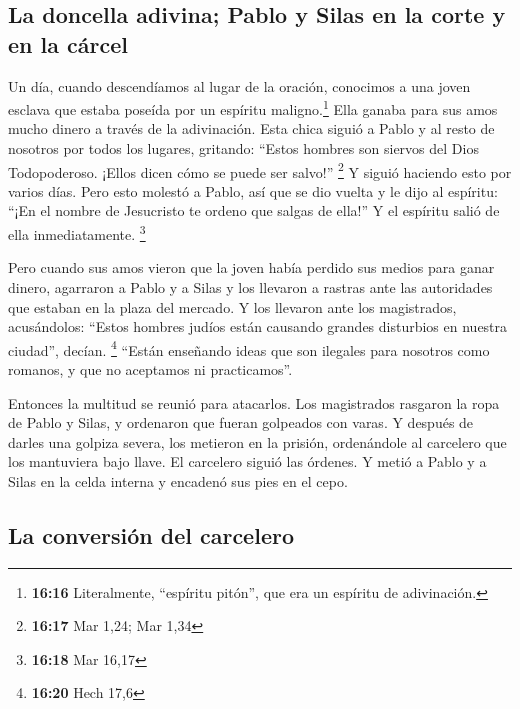 \hypertarget{la-doncella-adivina-pablo-y-silas-en-la-corte-y-en-la-cuxe1rcel}{%
\subsection{La doncella adivina; Pablo y Silas en la corte y en la
cárcel}\label{la-doncella-adivina-pablo-y-silas-en-la-corte-y-en-la-cuxe1rcel}}

 Un día, cuando descendíamos al lugar de la oración,
conocimos a una joven esclava que estaba poseída por un espíritu
maligno.\footnote{\textbf{16:16} Literalmente, ``espíritu pitón'', que
  era un espíritu de adivinación.} Ella ganaba para sus amos mucho
dinero a través de la adivinación.  Esta chica siguió a
Pablo y al resto de nosotros por todos los lugares, gritando: ``Estos
hombres son siervos del Dios Todopoderoso. ¡Ellos dicen cómo se puede
ser salvo!'' \footnote{\textbf{16:17} Mar 1,24; Mar 1,34}
 Y siguió haciendo esto por varios días. Pero esto
molestó a Pablo, así que se dio vuelta y le dijo al espíritu: ``¡En el
nombre de Jesucristo te ordeno que salgas de ella!'' Y el espíritu salió
de ella inmediatamente. \footnote{\textbf{16:18} Mar 16,17}

 Pero cuando sus amos vieron que la joven había perdido
sus medios para ganar dinero, agarraron a Pablo y a Silas y los llevaron
a rastras ante las autoridades que estaban en la plaza del mercado.
 Y los llevaron ante los magistrados, acusándolos:
``Estos hombres judíos están causando grandes disturbios en nuestra
ciudad'', decían. \footnote{\textbf{16:20} Hech 17,6} 
``Están enseñando ideas que son ilegales para nosotros como romanos, y
que no aceptamos ni practicamos''.

 Entonces la multitud se reunió para atacarlos. Los
magistrados rasgaron la ropa de Pablo y Silas, y ordenaron que fueran
golpeados con varas.  Y después de darles una golpiza
severa, los metieron en la prisión, ordenándole al carcelero que los
mantuviera bajo llave.  El carcelero siguió las órdenes.
Y metió a Pablo y a Silas en la celda interna y encadenó sus pies en el
cepo.

\hypertarget{la-conversiuxf3n-del-carcelero}{%
\subsection{La conversión del
carcelero}\label{la-conversiuxf3n-del-carcelero}}


